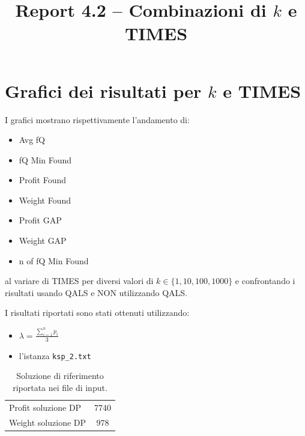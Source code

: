 \documentclass[a4paper,12pt]{article}
\title{Report 4.2 -- Combinazioni di $k$ e TIMES}
\begin{document}
\maketitle

\newpage

\section{Grafici dei risultati per $k$ e TIMES}

I grafici mostrano rispettivamente l'andamento di:
\begin{itemize}
    \item Avg fQ
    \item fQ Min Found
    \item Profit Found
    \item Weight Found
    \item Profit GAP
    \item Weight GAP
    \item n of fQ Min Found
\end{itemize}
al variare di TIMES per diversi valori di $k \in \{1,10,100,1000\}$ e confrontando
i risultati usando QALS e NON utilizzando QALS.

I risultati riportati sono stati ottenuti utilizzando:

\begin{itemize}
   \item $\lambda = \frac{\sum_{i=1}^{n} p_i}{3}$
    \item l'istanza \texttt{ksp\_2.txt}
\end{itemize}

\begin{table}[H]
\centering
\begin{tabular}{lc}
\hline
Profit soluzione DP & 7740 \\
Weight soluzione DP & 978 \\
\hline
\end{tabular}
\caption{Soluzione di riferimento riportata nei file di input.}
\label{tab:knapsack-solution}
\end{table}
\end{document}
